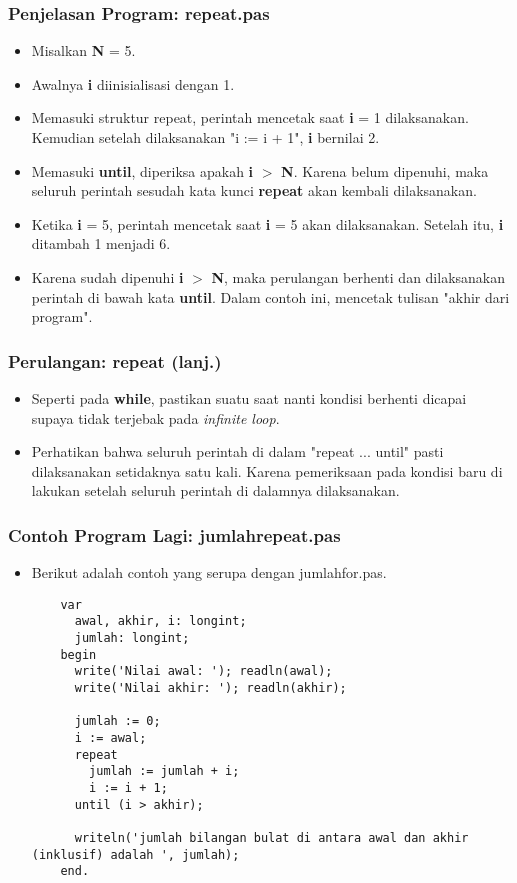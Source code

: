 \begin{frame}
\frametitle{Penjelasan Program: repeat.pas}
\begin{itemize}
  \item Misalkan \textbf{N} = 5.
  \item Awalnya \textbf{i} diinisialisasi dengan 1.
  \item Memasuki struktur repeat, perintah mencetak saat \textbf{i} = 1 dilaksanakan. Kemudian setelah dilaksanakan "i := i + 1", \textbf{i} bernilai 2.
  \item Memasuki \textbf{until}, diperiksa apakah \textbf{i} $>$ \textbf{N}. Karena belum dipenuhi, maka seluruh perintah sesudah kata kunci \textbf{repeat} akan kembali dilaksanakan.
  \item Ketika \textbf{i} = 5, perintah mencetak saat \textbf{i} = 5 akan dilaksanakan. Setelah itu, \textbf{i} ditambah 1 menjadi 6.
  \item Karena sudah dipenuhi \textbf{i} $>$ \textbf{N}, maka perulangan berhenti dan dilaksanakan perintah di bawah kata \textbf{until}. Dalam contoh ini, mencetak tulisan "akhir dari program".
\end{itemize}
\end{frame}

\begin{frame}
\frametitle{Perulangan: repeat (lanj.)}
\begin{itemize}
  \item Seperti pada \textbf{while}, pastikan suatu saat nanti kondisi berhenti dicapai supaya tidak terjebak pada \textit{infinite loop}.
  \item Perhatikan bahwa seluruh perintah di dalam "repeat ... until" \alert{pasti} dilaksanakan setidaknya satu kali. Karena pemeriksaan pada kondisi baru di lakukan setelah seluruh perintah di dalamnya dilaksanakan.
\end{itemize}
\end{frame}

\begin{frame}[fragile]
\frametitle{Contoh Program Lagi: jumlahrepeat.pas}
\begin{itemize}
  \item Berikut adalah contoh yang serupa dengan jumlahfor.pas.
  \begin{lstlisting}
    var
      awal, akhir, i: longint;
      jumlah: longint;
    begin
      write('Nilai awal: '); readln(awal);
      write('Nilai akhir: '); readln(akhir);

      jumlah := 0;
      i := awal;
      repeat
        jumlah := jumlah + i;
        i := i + 1;
      until (i > akhir);

      writeln('jumlah bilangan bulat di antara awal dan akhir (inklusif) adalah ', jumlah);
    end.
  \end{lstlisting}
\end{itemize}
\end{frame}

